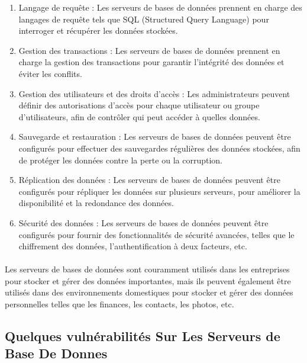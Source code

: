 \begin{enumerate}
	
 \item Langage de requête : Les serveurs de bases de données prennent en charge des langages de requête tels que SQL (Structured Query Language) pour interroger et récupérer les données stockées.
 
 \item Gestion des transactions : Les serveurs de bases de données prennent en charge la gestion des transactions pour garantir l'intégrité des données et éviter les conflits.
 
 \item Gestion des utilisateurs et des droits d'accès : Les administrateurs peuvent définir des autorisations d'accès pour chaque utilisateur ou groupe d'utilisateurs, afin de contrôler qui peut accéder à quelles données.
 
  \item Sauvegarde et restauration : Les serveurs de bases de données peuvent être configurés pour effectuer des sauvegardes régulières des données stockées, afin de protéger les données contre la perte ou la corruption.
 
 \item Réplication des données : Les serveurs de bases de données peuvent être configurés pour répliquer les données sur plusieurs serveurs, pour améliorer la disponibilité et la redondance des données.
 
 \item Sécurité des données : Les serveurs de bases de données peuvent être configurés pour fournir des fonctionnalités de sécurité avancées, telles que le chiffrement des données, l'authentification à deux facteurs, etc.
 
\end{enumerate}
\paragraph{ }
Les serveurs de bases de données sont couramment utilisés dans les entreprises pour stocker et gérer des données importantes, mais ils peuvent également être utilisés dans des environnements domestiques pour stocker et gérer des données personnelles telles que les finances, les contacts, les photos, etc.

\subsection{Quelques vulnérabilités Sur Les Serveurs de Base De Donnes }


